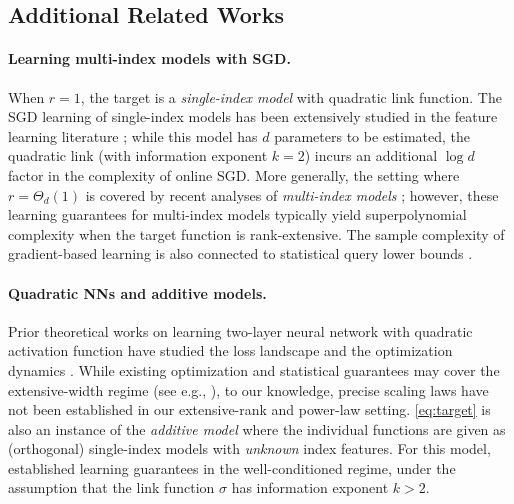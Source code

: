 \subsection{Additional Related Works}

\paragraph{Learning multi-index models with SGD.} 
When $r =1$, the target is a \textit{single-index model} with quadratic link function. The SGD learning of single-index models has been extensively studied in the feature learning literature \cite{benarous2021online,ba2022high,mousavi2022neural,ba2023learning,mousavi2023gradient,moniri2023theory,mahankali2024beyond,berthier2024learning,damian2024smoothing,glasgow2025propagation}; while this model has $d$ parameters to be estimated, the quadratic link (with information exponent $k=2$) incurs an additional $\log d$ factor in the complexity of online SGD. More generally, the setting where $r =\Theta_d(1)$ is covered by recent analyses of \textit{multi-index models} \cite{abbe2022merged,abbe2023sgd,bietti2023learning,dandi2023two,collins2023hitting,arous2024high,vural2024pruning,mousavi2024learning}; however, these
learning guarantees for multi-index models typically yield superpolynomial complexity when the target function is rank-extensive. 
The sample complexity of gradient-based learning is also connected to statistical query lower bounds \cite{damian2024computational,dandi2024benefits,lee2024neural,arnaboldi2024repetita}.  

\paragraph{Quadratic NNs and additive models.} Prior theoretical works on learning two-layer neural network with quadratic activation function have studied the loss landscape \cite{soltanolkotabi2018theoretical,du2018power,venturi2019spurious,gamarnik2019stationary,ghorbani2019limitations} and the optimization dynamics 
\cite{sarao2020optimization,arnaboldi2023escaping,martin2023impact,ren2024learning}. 
While existing optimization and statistical guarantees may cover the extensive-width regime (see e.g., \cite{du2018power,martin2023impact,ren2024learning}), to our knowledge, precise scaling laws have not been established in our extensive-rank and power-law setting.
\eqref{eq:target} is also an instance of the \textit{additive model} \cite{stone1985additive,hastie1987generalized,bach2017breaking} where the individual functions are given as (orthogonal) single-index models with \textit{unknown} index features. For this model, \cite{oko2024learning,simsek2024learning} established learning guarantees in the well-conditioned regime, under the assumption that the link function $\sigma$ has information exponent $k>2$. 

